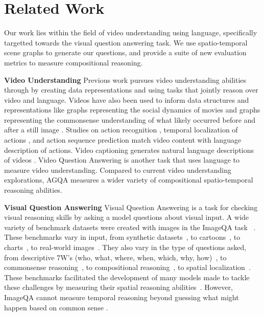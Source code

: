 
\section{Related Work}
Our work lies within the field of video understanding using language, specifically targetted towards the visual question answering task. We use spatio-temporal scene graphs to generate our questions, and provide a suite of new evaluation metrics to measure compositional reasoning.

\noindent\textbf{Video Understanding}
Previous work pursues video understanding abilities through by creating data representations and using tasks that jointly reason over video and language. 
Videos have also been used to inform data structures and representations like graphs representing the social dynamics of movies and graphs \cite{vicol2018moviegraphs} representing the commonsense understanding of what likely occurred before and after a still image \cite{park2020visualcomet}. Studies on action recognition \cite{fernando2016discriminative, song2016multimodal}, temporal localization of actions \cite{anne2017localizing,gao2017tall}, and action sequence prediction \cite{nagarajan2020ego} match video content with language description of actions. Video captioning generates natural language descriptions of videos \cite{gan2017semantic, guadarrama2013youtube2text, venugopalan2015sequence}. Video Question Answering is another task that uses language to measure video understanding. Compared to current video understanding explorations, AGQA measures a wider variety of compositional spatio-temporal reasoning abilities. 

\noindent\textbf{Visual Question Answering}
Visual Question Answering is a task for checking visual reasoning skills by asking a model questions about visual input. A wide variety of benchmark datasets were created with images in the ImageQA task ~\cite{johnson2017clevr,hudson2019gqa,antol2015vqa,zellers2019recognition,goyal2017making,krishna2017visual,zhu2016visual7w,kim2020answering}. These benchmarks vary in input, from synthetic datasets~\cite{johnson2017clevr}, to cartoons~\cite{antol2015vqa}, to charts~\cite{kim2017deepstory}, to real-world images~\cite{hudson2019gqa,krishna2017visual,zhu2016visual7w,goyal2017making,zellers2019recognition,antol2015vqa}. They also vary in the type of questions asked, from descriptive 7W's (who, what, where, when, which, why, how)~\cite{zhu2016visual7w}, to commonsense reasoning~\cite{zellers2019recognition}, to compositional reasoning~\cite{johnson2017clevr,hudson2019gqa}, to spatial localization~\cite{zhu2016visual7w,krishna2017visual,hudson2019gqa}. These benchmarks facilitated the development of many models made to tackle these challenges by measuring their spatial reasoning abilities~\cite{lu2016hierarchical, vatashsky2020vqa, chen2020counterfactual}. However, ImageQA cannot measure temporal reasoning beyond guessing what might happen based on common sense \cite{zellers2019recognition}.

